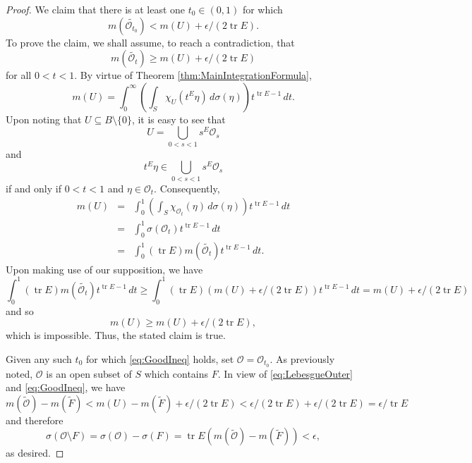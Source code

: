 \documentclass[11pt]{article}
\theoremstyle{theorem}
\newcommand\tr{\operatorname{tr}}
\begin{document}
\begin{proof}
We claim that there is at least one $t_0\in (0,1)$ for which 
\begin{equation}\label{eq:GoodIneq}
m(\widetilde{\mathcal{O}_{t_0}})< m(U)+\epsilon/(2\tr E).
\end{equation}
To prove the claim, we shall assume, to reach a contradiction, that 
\begin{equation*}
m(\widetilde{\mathcal{O}_{t}})\geq m(U)+\epsilon/(2\tr E)
\end{equation*}
for all $0<t<1$. By virtue of Theorem \ref{thm:MainIntegrationFormula},
\begin{equation*}
m(U)=\int_{0}^\infty\left(\int_S \chi_{U}(t^E\eta)\,d\sigma(\eta)\right)t^{\tr E-1}\,dt.
\end{equation*}
Upon noting that $U\subseteq B\setminus\{0\}$, it is easy to see that
\begin{equation*}
U=\bigcup_{0<s<1}s^E\mathcal{O}_s
\end{equation*}
and
\begin{equation*}
t^E\eta\in \bigcup_{0<s<1}s^E\mathcal{O}_s
\end{equation*}
if and only if $0<t<1$ and $\eta\in \mathcal{O}_t$. Consequently,
\begin{eqnarray*}
m(U)&=&\int_0^1\left(\int_S\chi_{\mathcal{O}_t}(\eta)\,d\sigma(\eta)\right)t^{\tr E-1}\,dt\\
&=&\int_0^1\sigma(\mathcal{O}_t)t^{\tr E-1}\,dt\\
&=&\int_0^1 (\tr E)m(\widetilde{\mathcal{O}_t})t^{\tr E-1}\,dt.
\end{eqnarray*}
Upon making use of our supposition, we have
\begin{equation*}
\int_0^1(\tr E) m(\widetilde{\mathcal{O}_t})t^{\tr E-1}\,dt\geq \int_0^1(\tr E)(m(U)+\epsilon/(2\tr E))t^{\tr E-1}\,dt=m(U)+\epsilon/(2\tr E)
\end{equation*}
and so
\begin{equation*}
m(U)\geq m(U)+\epsilon/(2\tr E),
\end{equation*}
which is impossible. Thus, the stated claim is true.

Given any such $t_0$ for which \eqref{eq:GoodIneq} holds, set $\mathcal{O}=\mathcal{O}_{t_0}$. As previously noted, $\mathcal{O}$ is an open subset of $S$ which contains $F$. In view of \eqref{eq:LebesgueOuter} and \eqref{eq:GoodIneq}, we have
\begin{equation*}
m(\widetilde{\mathcal{O}})-m(\widetilde{F})<m(U)-m(\widetilde{F})+\epsilon/(2\tr E)<\epsilon/(2\tr E)+\epsilon/(2\tr E)=\epsilon/\tr E
\end{equation*}
and therefore
\begin{equation*}
\sigma(\mathcal{O}\setminus F)=\sigma(\mathcal{O})-\sigma(F)=\tr E(m(\widetilde{\mathcal{O}})-m(\widetilde{F}))<\epsilon,
\end{equation*}
as desired.
\end{proof}
\end{document}
